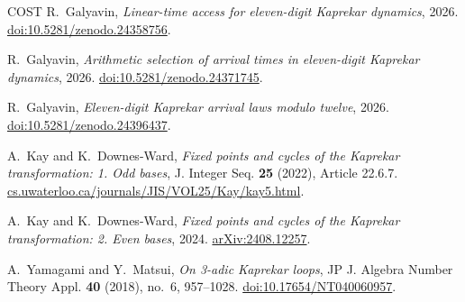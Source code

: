 \documentclass[11pt,reqno]{amsart}
\theoremstyle{remark}
\begin{document}
\begin{thebibliography}{COST}
R.~Galyavin, \emph{Linear-time access for eleven-digit Kaprekar dynamics}, 2026.
\href{https://doi.org/10.5281/zenodo.24358756}{doi:10.5281/zenodo.24358756}.

R.~Galyavin, \emph{Arithmetic selection of arrival times in eleven-digit Kaprekar dynamics}, 2026.
\href{https://doi.org/10.5281/zenodo.24371745}{doi:10.5281/zenodo.24371745}.

R.~Galyavin, \emph{Eleven-digit Kaprekar arrival laws modulo twelve}, 2026.
\href{https://doi.org/10.5281/zenodo.24396437}{doi:10.5281/zenodo.24396437}.

A.~Kay and K.~Downes-Ward, \emph{Fixed points and cycles of the Kaprekar
transformation: 1. Odd bases}, J. Integer Seq. \textbf{25} (2022),
Article 22.6.7.
\href{https://cs.uwaterloo.ca/journals/JIS/VOL25/Kay/kay5.html}{cs.uwaterloo.ca/journals/JIS/VOL25/Kay/kay5.html}.

A.~Kay and K.~Downes-Ward, \emph{Fixed points and cycles of the Kaprekar
transformation: 2. Even bases}, 2024.
\href{https://arxiv.org/abs/2408.12257}{arXiv:2408.12257}.

A.~Yamagami and Y.~Matsui, \emph{On 3-adic Kaprekar loops},
JP J. Algebra Number Theory Appl. \textbf{40} (2018), no.~6, 957--1028.
\href{https://doi.org/10.17654/NT040060957}{doi:10.17654/NT040060957}.

\end{thebibliography}
\endgroup
\end{document}
